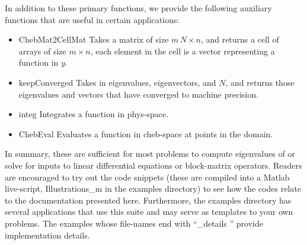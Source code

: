 \documentclass[%
secnumarabic,%
 amssymb, amsmath,%
 aps,prf,superscriptaddress,longbibliography
frontmatterverbose,
]{revtex4-2}
\begin{document}
In addition to these primary functions, we provide the following auxiliary functions that are useful in certain applications:
\begin{itemize}
  \item {\sf ChebMat2CellMat} Takes a matrix of size $m\,N \times n$, and returns a cell of arrays of size $m\times n$, each element in the cell is a vector representing a function in $y$.
  \item {\sf keepConverged} Takes in eigenvalues, eigenvectors, and $N$, and returns those eigenvalues and vectors that have converged to machine precision.
  \item {\sf integ} Integrates a function in phys-space.
  \item {\sf ChebEval} Evaluates a function in cheb-space at points in the domain.
\end{itemize}
In summary, these are sufficient for most problems to compute eigenvalues of or solve for inputs to linear differential equations or block-matrix operators. Readers are encouraged to try out the code snippets (these are compiled into a Matlab live-script, {\sf Illustrations\_m} in the examples directory) to see how the codes relate to the documentation presented here. Furthermore, the examples directory has several applications that use this suite and may serve as templates to your own problems. The examples whose file-names end with ``\_details '' provide implementation details.
\end{document}
